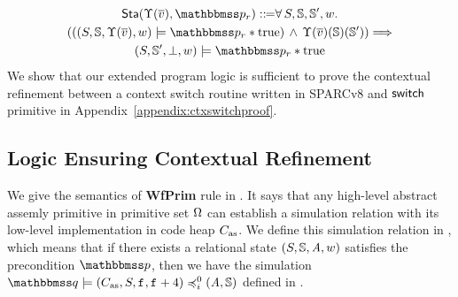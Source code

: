 {\small
\begin{multline*}
    \Sta(\hprim(\args{\val}), \relastP_r) 
    \define 
    \forall \, \state, \hpstate, \hpstate', \word. \\ 
    ((\asrtmodel{(\state, \hpstate, \hprim(\args{\val}), \word)}
        {\relastP_r\sepstar\atrue}) 
    \,\land\,
    \hprim(\args{\val})(\hpstate)(\hpstate'))\imp \\
    \asrtmodel{(\state, \hpstate', \primdone, \word)}
        {\relastP_r\sepstar\atrue} 
\end{multline*}
}
We show that our extended program logic is sufficient 
to prove the contextual refinement between 
a context switch routine written in SPARCv8
and $\mathsf{switch}$ primitive 
in Appendix~\ref{appendix:ctxswitchproof}. 
\subsection{Logic Ensuring Contextual Refinement}
\label{subsec:logic-ensuring-ctxrefinement}

We give the semantics of \textbf{WfPrim} rule in 
\Def{\ref{def:wdprim-sem}}. 
It says that any high-level abstract assemly primitive 
in primitive set $\Omega$ can 
establish a simulation relation with its low-level 
implementation in code heap $C_{\text{as}}$. We define this 
simulation relation in \Def{\ref{def:sim-impl-prim}}, 
which means that if there 
exists a relational state $(S, \mathbb{S}, \textit{A}, w)$ 
satisfies the precondition $\relastP$, then we have 
the simulation 
$\simFunctionSt{\relastQ}{(\asmimp, \state, \lab{}, \lab{} + 4)}
    {i}{0}{(\primcom, \hpstate)}$ defined in 
\Def{\ref{def:sim-imp-prim-state}}. 

